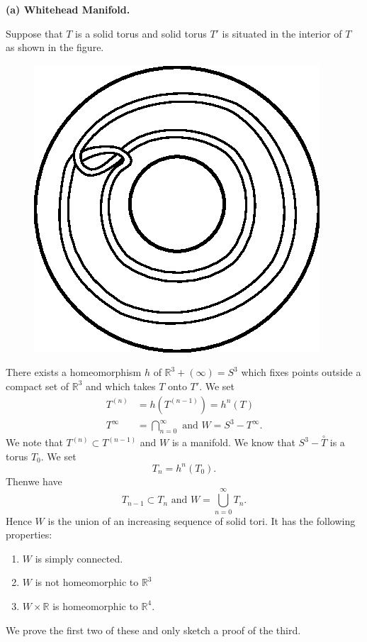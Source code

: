\medskip
\noindent
\textbf{(a) Whitehead Manifold.}\pageoriginale

Suppose that $T$ is a solid torus and solid torus $T'$ is situated in
the interior of $T$ as shown in the figure. 
\begin{figure}[H]
\centering
\includegraphics{vol44-fig/fig44-12.eps}
\end{figure}

There exists a homeomorphism $h$ of $\mathbb{R}^3 + (\infty) = S^3$
which fixes points outside a compact set of $\mathbb{R}^3$ and which
takes $T$ onto $T'$. We set 
\begin{align*}
T^{(n)} & = h(T^{(n-1)}) = h^n (T)\\
T^{\infty} & = \bigcap_{n=0}^{\infty} \text{ and } W = S^3 -
T^{\infty}. 
\end{align*}
We note that $T^{(n)} \subset T^{(n-1)}$ and $W$ is a manifold. We
know that $S^3 - \overset{\circ}{T}$ is a torus $T_0$. We set 
$$
T_n = h^n (T_0).
$$
Then\pageoriginale we have 
$$
T_{n-1} \subset T_n \text{ and } W = \bigcup_{n=0}^{\infty} T_n. 
$$
Hence $W$ is the union of an increasing sequence of solid tori. It
has the following properties: 
\begin{enumerate}[(1)]
\item $W$ is simply connected.

\item $W$ is not homeomorphic to $\mathbb{R}^3$

\item $W \times \mathbb{R}$ is homeomorphic to $\mathbb{R}^4$.
\end{enumerate}
We prove the first two of these and only sketch a proof of the third. 

